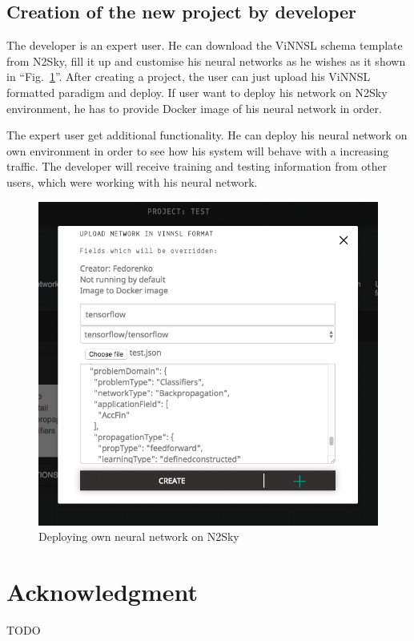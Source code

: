 \documentclass[conference]{IEEEtran}
\begin{document}
\subsection{Creation of the new project by developer}
The developer is an expert user. He can download the ViNNSL schema template from N2Sky, fill it up and customise his neural networks as he wishes as it shown in ``Fig.~\ref{fig:own}''. After creating a project, the user can just upload his ViNNSL formatted paradigm and deploy. If user want to deploy his network on N2Sky environment, he has to provide Docker image of his neural network in order. 

The expert user get additional functionality. He can deploy his neural network on own environment in order to see how his system will behave with a increasing traffic. The developer will receive training and testing information from other users, which were working with his neural network.

\begin{figure}[H]
  \includegraphics[width=\linewidth]{own_nn.png}
  \caption{Deploying own neural network on N2Sky}
  \label{fig:own}
\end{figure}

\section*{Acknowledgment}


\begin{thebibliography}{00}
 TODO
\end{thebibliography}
\end{document}
